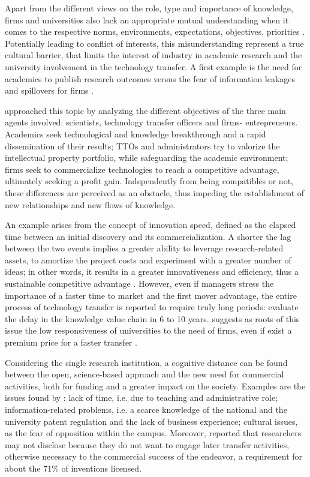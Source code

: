 Apart from the different views on the role, type and importance of knowledge, firms and universities also lack an appropriate mutual understanding when it comes to the respective norms, environments, expectations, objectives, priorities \citep{Siegel2003a, Link2005, Muscio2010}. Potentially leading to conflict of interests, this misunderstanding represent a true cultural barrier, that limits the interest of industry in academic research and the university involvement in the technology transfer. A first example is the need for academics to publish research outcomes versus the fear of information leakages and spillovers for firms \citep{Gilsing2011}.

\citet{Siegel2007} approached this topic by analyzing the different objectives of the three main agents involved: scientists, technology transfer officers and firms- entrepreneurs. Academics seek technological and knowledge breakthrough and a rapid dissemination of their results; TTOs and administrators try to valorize the intellectual property portfolio, while safeguarding the academic environment; firms seek to commercialize technologies to reach a competitive advantage, ultimately seeking a profit gain. Independently from being compatibles or not, these differences are perceived as an obstacle, thus impeding the establishment of new relationships and new flows of knowledge.

An example arises from the concept of innovation speed, defined as the elapsed time between an initial discovery and its commercialization. A shorter the lag between the two events implies a greater ability to leverage research-related assets, to amortize the project costs and experiment with a greater number of ideas; in other words, it results in a greater innovativeness and efficiency, thus a sustainable competitive advantage \citep{Markman2005}. However, even if managers stress the importance of a faster time to market and the first mover advantage, the entire process of technology transfer is reported to require truly long periods: \citet{Heher2006} evaluate the delay in the knowledge value chain in 6 to 10 years. \citet{Link2005} suggests as roots of this issue the low responsiveness of universities to the need of firms, even if exist a premium price for a faster transfer \citep{Markman2005}.

Considering the single research institution, a cognitive distance can be found between the open, science-based approach and the new need for commercial activities, both for funding and a greater impact on the society. Examples are the issues found by \citet{Baldini2007}: lack of time, i.e. due to teaching and administrative role; information-related problems, i.e. a scarce knowledge of the national and the university patent regulation and the lack of business experience; cultural issues, as the fear of opposition within the campus. Moreover, \citet{Jensen2003} reported that researchers may not disclose because they do not want to engage later transfer activities, otherwise necessary to the commercial success of the endeavor, a requirement for about the 71\% of inventions licensed.

